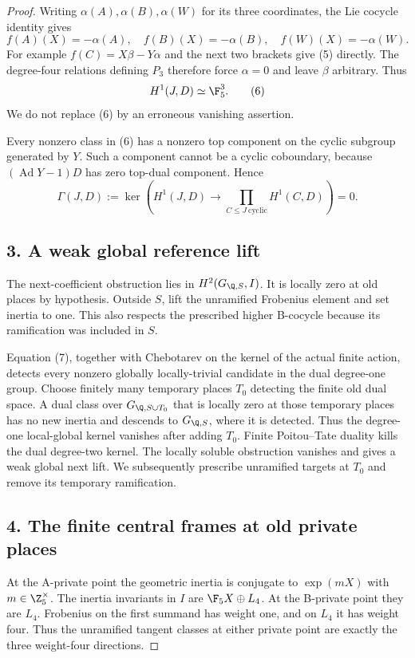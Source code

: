 \begin{proof}
Writing $\alpha(A),\alpha(B),\alpha(W)$ for its three coordinates, the Lie cocycle identity gives
\[
 f(A)(X)=-\alpha(A),\quad
 f(B)(X)=-\alpha(B),\quad
 f(W)(X)=-\alpha(W).
 \tag{5}
\]
For example $f(C)=X\beta-Y\alpha$ and the next two brackets give (5) directly. The degree-four relations defining $P_3$ therefore force $\alpha=0$ and leave $\beta$ arbitrary. Thus
\[
 H^1(J,D)\simeq\F_5^3.
 \tag{6}
\]
We do not replace (6) by an erroneous vanishing assertion.

Every nonzero class in (6) has a nonzero top component on the cyclic subgroup generated by $Y$. Such a component cannot be a cyclic coboundary, because $(\operatorname{Ad}Y-1)D$ has zero top-dual component. Hence
\[
 \Gamma(J,D):=
 \ker\!\left(H^1(J,D)\longrightarrow
 \prod_{C\le J\ \mathrm{cyclic}}H^1(C,D)\right)=0.
 \tag{7}
\]

\subsection*{3. A weak global reference lift}
The next-coefficient obstruction lies in $H^2(G_{\Q,S},I)$. It is locally zero at old places by hypothesis. Outside $S$, lift the unramified Frobenius element and set inertia to one. This also respects the prescribed higher B-cocycle because its ramification was included in $S$.

Equation (7), together with Chebotarev on the kernel of the actual finite action, detects every nonzero globally locally-trivial candidate in the dual degree-one group. Choose finitely many temporary places $T_0$ detecting the finite old dual space. A dual class over $G_{\Q,S\cup T_0}$ that is locally zero at those temporary places has no new inertia and descends to $G_{\Q,S}$, where it is detected. Thus the degree-one local-global kernel vanishes after adding $T_0$. Finite Poitou--Tate duality kills the dual degree-two kernel. The locally soluble obstruction vanishes and gives a weak global next lift. We subsequently prescribe unramified targets at $T_0$ and remove its temporary ramification.

\subsection*{4. The finite central frames at old private places}
At the A-private point the geometric inertia is conjugate to $\exp(mX)$ with $m\in\Z_5^\times$. The inertia invariants in $I$ are $\F_5X\oplus L_4$. At the B-private point they are $L_4$. Frobenius on the first summand has weight one, and on $L_4$ it has weight four. Thus the unramified tangent classes at either private point are exactly the three weight-four directions.


\end{proof}
